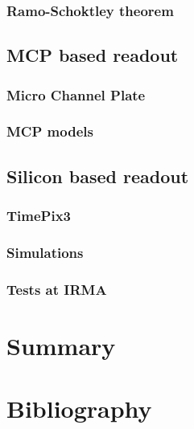 \begin{refsection}
	\subsubsection{Ramo-Schoktley theorem}
	\subsection{MCP based readout}
	\subsubsection{Micro Channel Plate}
	\subsubsection{MCP models}
	\subsection{Silicon based readout}
	\subsubsection{TimePix3}
	\subsubsection{Simulations}
	\subsubsection{Tests at IRMA}

	\section{Summary}
	\label{ch3:Summary}
	\lipsum

	\cleardoublepage
	\section{Bibliography}
	\label{ch3:bib}
	\printbibliography[heading=subbibliography]
\end{refsection}